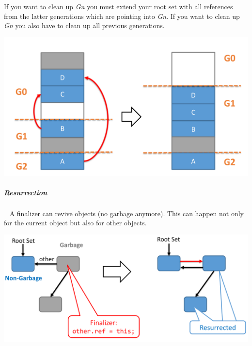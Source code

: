 \documentclass[12pt,twoside,landscape]{extarticle}
\begin{document}
\begin{multicols}{4}
If you want to clean up \emph{Gn} you must extend your root set with all references from the latter generations which are pointing into \emph{Gn}.
If you want to clean up \emph{Gn} you also have to clean up all previous generations.

{
\begin{center}
\includegraphics[width=.9\linewidth]{img/gc_of_g0.png}
\end{center}
\label{fig:gc-of-g0}
}

\subparagraph{Resurrection} \
\label{sec:org4b0550e}
A finalizer can revive objects (no garbage anymore).
This can happen not only for the current object but also for other objects.


{
\begin{center}
\includegraphics[width=.9\linewidth]{img/resurrection_example.png}
\end{center}
\label{fig:resurrection-example}
}


\end{multicols}
\end{document}
